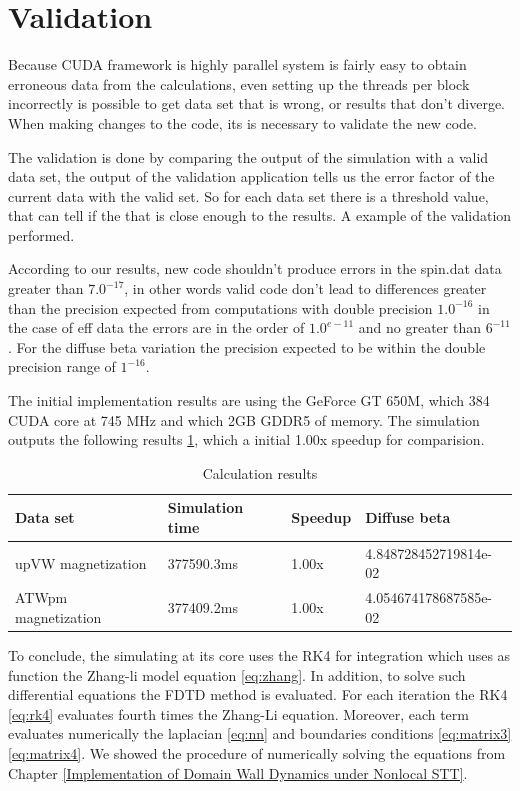 \section{Validation}

Because CUDA framework is highly parallel system is fairly easy to obtain erroneous data from the calculations, even setting up the threads per block incorrectly is possible to get data set that is wrong, or results that don't diverge. When making changes to the code, its is necessary to validate the new code.

The validation is done by comparing the output of the simulation with a valid data set, the output of the validation application tells us the error factor of the current data with the valid set. So for each data set there is a threshold value, that can tell if the that is close enough to the results. A example of the validation performed.

According to our results, new code shouldn't produce errors in the spin.dat data greater than $7.0^{-17}$, in other words valid code don't lead to differences greater than the precision expected from computations with double precision $1.0^{-16}$ in the case of eff data the errors are in the order of $1.0^{e-11}$ and no greater than $6^{-11}$. For the diffuse beta variation the precision expected to be within the double precision range of $1^{-16}$. 


The initial implementation results are using the GeForce GT 650M, which 384 CUDA core at 745 MHz and which 2GB GDDR5 of memory. The simulation outputs the following results \ref{tab:results}, which a initial 1.00x speedup for comparision.

\begin{table}[h]
\centering
\begin{tabular}{| l | l | l | l |}
\hline
Data set & Simulation time & Speedup & Diffuse beta  \\
\hline
upVW magnetization & 377590.3ms & 1.00x & 4.848728452719814e-02 \\
\hline
ATWpm magnetization & 377409.2ms & 1.00x & 4.054674178687585e-02 \\
\hline
\end{tabular}
\caption{Calculation results}
\label{tab:results}
\end{table}


\vspace{4.0em}

To conclude, the simulating at its core uses the RK4 for integration which uses as function the Zhang-li model equation \ref{eq:zhang}. In addition, to solve such differential equations the FDTD method is evaluated. For each iteration the RK4 \ref{eq:rk4} evaluates fourth times the Zhang-Li equation. Moreover, each term evaluates numerically the laplacian \ref{eq:nn} and boundaries conditions \ref{eq:matrix3} \ref{eq:matrix4}. We showed the procedure of numerically solving the equations from Chapter \ref{Implementation of Domain Wall Dynamics under Nonlocal STT}.




